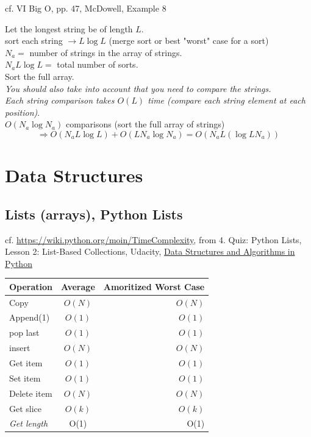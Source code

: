 \documentclass[10pt]{amsart}
\begin{document}
\begin{multicols*}{2}
cf. VI Big O, pp. 47, McDowell, Example 8

Let the longest string be of length $L$. \\
sort each string $\to L\log{L}$ (merge sort or best "worst" case for a sort) \\
$N_a= $ number of strings in the array of strings. \\
$N_a L \log{L} = $ total number of sorts. \\

Sort the full array.\\
\emph{You should also take into account that you need to compare the strings.} \\
\emph{Each string comparison takes $O(L)$ time (compare each string element at each position)}. \\
$O(N_a \log{N_a})$ comparisons (sort the full array of strings) \\

\[
\Longrightarrow \boxed{ O(N_a L \log{L}) + O(L N_a \log{N_a}) = O(N_aL (\log{LN_a})) }
\]



\section{Data Structures}

\subsection{Lists (arrays), Python Lists}

cf. \url{https://wiki.python.org/moin/TimeComplexity}, from 4. Quiz: Python Lists, Lesson 2: List-Based Collections, Udacity, \href{https://classroom.udacity.com/courses/ud513/lessons/7117335401/concepts/78894523130923}{Data Structures and Algorithms in Python}
\begin{center}
	\begin{tabular}{ l | c | r }
		\hline
		Operation & Average & Amoritized Worst Case \\ \hline
		Copy & $O(N)$ & $O(N)$ \\ \hline
		Append(1) & $O(1)$ & $O(1)$ \\ \hline
		pop last & $O(1)$ & $O(1)$ \\ \hline
		insert & $O(N)$ & $O(N)$ \\ \hline
		Get item & $O(1)$ & $O(1)$ \\ \hline
		Set item & $O(1)$ & $O(1)$ \\ \hline
		Delete item & $O(N)$ & $O(N)$ \\ \hline
		Get slice & $O(k)$ & $O(k)$ \\ \hline		
		\emph{Get length} & O(1) & O(1) \\ \hline
		\hline
	\end{tabular}
\end{center}


\end{multicols*}
\end{document}
